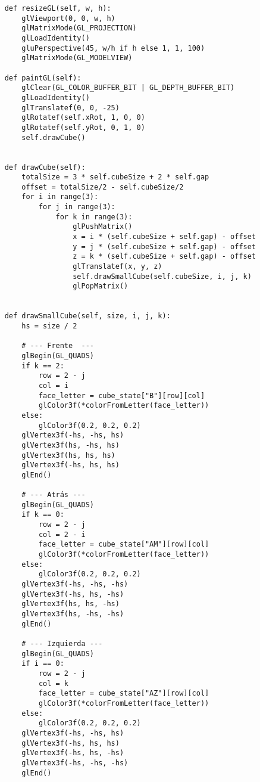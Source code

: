 \begin{lstlisting}
    def resizeGL(self, w, h):
        glViewport(0, 0, w, h)
        glMatrixMode(GL_PROJECTION)
        glLoadIdentity()
        gluPerspective(45, w/h if h else 1, 1, 100)
        glMatrixMode(GL_MODELVIEW)

    def paintGL(self):
        glClear(GL_COLOR_BUFFER_BIT | GL_DEPTH_BUFFER_BIT)
        glLoadIdentity()
        glTranslatef(0, 0, -25)
        glRotatef(self.xRot, 1, 0, 0)
        glRotatef(self.yRot, 0, 1, 0)
        self.drawCube()
        

    def drawCube(self):
        totalSize = 3 * self.cubeSize + 2 * self.gap
        offset = totalSize/2 - self.cubeSize/2
        for i in range(3):
            for j in range(3):
                for k in range(3):
                    glPushMatrix()
                    x = i * (self.cubeSize + self.gap) - offset
                    y = j * (self.cubeSize + self.gap) - offset
                    z = k * (self.cubeSize + self.gap) - offset
                    glTranslatef(x, y, z)
                    self.drawSmallCube(self.cubeSize, i, j, k)
                    glPopMatrix()
                    

    def drawSmallCube(self, size, i, j, k):
        hs = size / 2

        # --- Frente  ---
        glBegin(GL_QUADS)
        if k == 2:
            row = 2 - j
            col = i
            face_letter = cube_state["B"][row][col]
            glColor3f(*colorFromLetter(face_letter))
        else:
            glColor3f(0.2, 0.2, 0.2)
        glVertex3f(-hs, -hs, hs)
        glVertex3f(hs, -hs, hs)
        glVertex3f(hs, hs, hs)
        glVertex3f(-hs, hs, hs)
        glEnd()

        # --- Atrás ---
        glBegin(GL_QUADS)
        if k == 0:
            row = 2 - j
            col = 2 - i
            face_letter = cube_state["AM"][row][col]
            glColor3f(*colorFromLetter(face_letter))
        else:
            glColor3f(0.2, 0.2, 0.2)
        glVertex3f(-hs, -hs, -hs)
        glVertex3f(-hs, hs, -hs)
        glVertex3f(hs, hs, -hs)
        glVertex3f(hs, -hs, -hs)
        glEnd()

        # --- Izquierda ---
        glBegin(GL_QUADS)
        if i == 0:
            row = 2 - j
            col = k
            face_letter = cube_state["AZ"][row][col]
            glColor3f(*colorFromLetter(face_letter))
        else:
            glColor3f(0.2, 0.2, 0.2)
        glVertex3f(-hs, -hs, hs)
        glVertex3f(-hs, hs, hs)
        glVertex3f(-hs, hs, -hs)
        glVertex3f(-hs, -hs, -hs)
        glEnd()


\end{lstlisting}
